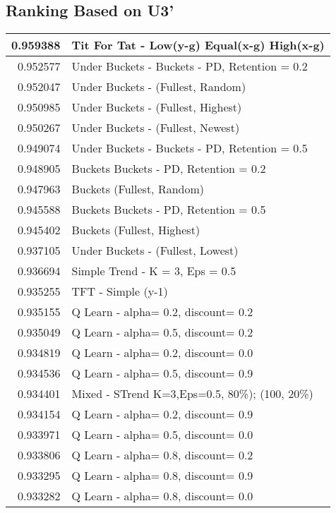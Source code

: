 \begin{table}[!hbtp]
\subsection{Ranking Based on U3'}
\begin{footnotesize}
\begin{tabular}{|r|l|}\hline  \label{U3results}
0.959388 & Tit For Tat - Low(y-g) Equal(x-g) High(x-g)\\ \hline
0.952577 & Under Buckets - Buckets - PD, Retention = 0.2\\ \hline
0.952047 & Under Buckets - (Fullest, Random)\\ \hline
0.950985 & Under Buckets - (Fullest, Highest)\\ \hline
0.950267 & Under Buckets - (Fullest, Newest)\\ \hline
0.949074 & Under Buckets - Buckets - PD, Retention = 0.5\\ \hline
0.948905 & Buckets Buckets - PD, Retention = 0.2\\ \hline
0.947963 & Buckets (Fullest, Random)\\ \hline
0.945588 & Buckets Buckets - PD, Retention = 0.5\\ \hline
0.945402 & Buckets (Fullest, Highest)\\ \hline
0.937105 & Under Buckets - (Fullest, Lowest)\\ \hline
0.936694 & Simple Trend - K = 3, Eps = 0.5\\ \hline
0.935255 & TFT - Simple (y-1)\\ \hline
0.935155 & Q Learn - alpha= 0.2, discount= 0.2\\ \hline
0.935049 & Q Learn - alpha= 0.5, discount= 0.2\\ \hline
0.934819 & Q Learn - alpha= 0.2, discount= 0.0\\ \hline
0.934536 & Q Learn - alpha= 0.5, discount= 0.9\\ \hline
0.934401 & Mixed - {STrend K=3,Eps=0.5, 80\%); (100, 20\%)}\\ \hline
0.934154 & Q Learn - alpha= 0.2, discount= 0.9\\ \hline
0.933971 & Q Learn - alpha= 0.5, discount= 0.0\\ \hline
0.933806 & Q Learn - alpha= 0.8, discount= 0.2\\ \hline
0.933295 & Q Learn - alpha= 0.8, discount= 0.9\\ \hline
0.933282 & Q Learn - alpha= 0.8, discount= 0.0\\ \hline

\end{tabular}
\end{footnotesize}
\end{table}

